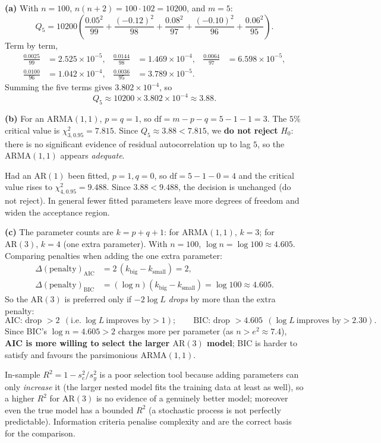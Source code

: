 \documentclass[11pt]{article}
\begin{document}
\textbf{(a)} With $n=100$, $n(n+2)=100\cdot102=10200$, and $m=5$:
\[
Q_5=10200\left(\frac{0.05^2}{99}+\frac{(-0.12)^2}{98}+\frac{0.08^2}{97}+\frac{(-0.10)^2}{96}+\frac{0.06^2}{95}\right).
\]
Term by term,
\[
\begin{aligned}
\frac{0.0025}{99}&=2.525\times10^{-5}, &
\frac{0.0144}{98}&=1.469\times10^{-4}, &
\frac{0.0064}{97}&=6.598\times10^{-5},\\
\frac{0.0100}{96}&=1.042\times10^{-4}, &
\frac{0.0036}{95}&=3.789\times10^{-5}. &&
\end{aligned}
\]
Summing the five terms gives $3.802\times10^{-4}$, so
\[
Q_5\approx10200\times3.802\times10^{-4}\approx \boxed{3.88}.
\]

\textbf{(b)} For an $\mathrm{ARMA}(1,1)$, $p=q=1$, so $\mathrm{df}=m-p-q=5-1-1=3$. The $5\%$ critical value is $\chi^2_{3,0.95}=7.815$. Since $Q_5\approx3.88<7.815$, we \textbf{do not reject} $H_0$: there is no significant evidence of residual autocorrelation up to lag $5$, so the $\mathrm{ARMA}(1,1)$ appears \emph{adequate}.

Had an $\mathrm{AR}(1)$ been fitted, $p=1,q=0$, so $\mathrm{df}=5-1-0=4$ and the critical value rises to $\chi^2_{4,0.95}=9.488$. Since $3.88<9.488$, the decision is unchanged (do not reject). In general fewer fitted parameters leave more degrees of freedom and widen the acceptance region.

\textbf{(c)} The parameter counts are $k=p+q+1$: for $\mathrm{ARMA}(1,1)$, $k=3$; for $\mathrm{AR}(3)$, $k=4$ (one extra parameter). With $n=100$, $\log n=\log 100\approx4.605$. Comparing penalties when adding the one extra parameter:
\[
\begin{aligned}
\Delta(\text{penalty})_{\mathrm{AIC}}&=2\,(k_{\text{big}}-k_{\text{small}})=2,\\
\Delta(\text{penalty})_{\mathrm{BIC}}&=(\log n)(k_{\text{big}}-k_{\text{small}})=\log 100\approx4.605 .
\end{aligned}
\]
So the $\mathrm{AR}(3)$ is preferred only if $-2\log L$ \emph{drops} by more than the extra penalty:
\[
\text{AIC: drop }>2\ \ (\text{i.e.}\ \log L\ \text{improves by}>1);\qquad
\text{BIC: drop }>4.605\ \ (\log L\ \text{improves by}>2.30).
\]
Since BIC's $\log n=4.605>2$ charges more per parameter (as $n>e^2\approx7.4$), \textbf{AIC is more willing to select the larger $\mathrm{AR}(3)$ model}; BIC is harder to satisfy and favours the parsimonious $\mathrm{ARMA}(1,1)$.

In-sample $R^2=1-s_e^2/s_y^2$ is a poor selection tool because adding parameters can only \emph{increase} it (the larger nested model fits the training data at least as well), so a higher $R^2$ for $\mathrm{AR}(3)$ is no evidence of a genuinely better model; moreover even the true model has a bounded $R^2$ (a stochastic process is not perfectly predictable). Information criteria penalise complexity and are the correct basis for the comparison.
\end{document}
